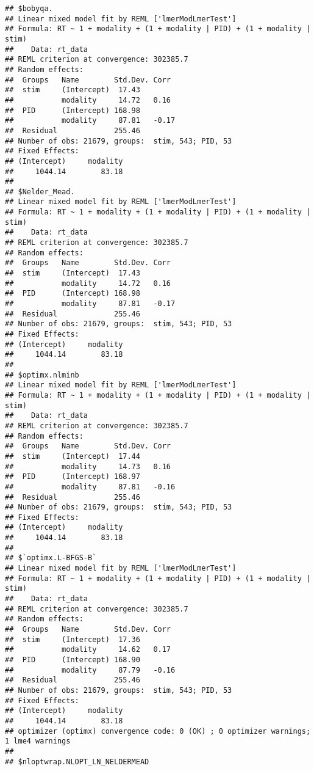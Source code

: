 \documentclass[
]{article}
\begin{document}
\begin{verbatim}
## $bobyqa.
## Linear mixed model fit by REML ['lmerModLmerTest']
## Formula: RT ~ 1 + modality + (1 + modality | PID) + (1 + modality | stim)
##    Data: rt_data
## REML criterion at convergence: 302385.7
## Random effects:
##  Groups   Name        Std.Dev. Corr 
##  stim     (Intercept)  17.43        
##           modality     14.72   0.16 
##  PID      (Intercept) 168.98        
##           modality     87.81   -0.17
##  Residual             255.46        
## Number of obs: 21679, groups:  stim, 543; PID, 53
## Fixed Effects:
## (Intercept)     modality  
##     1044.14        83.18  
## 
## $Nelder_Mead.
## Linear mixed model fit by REML ['lmerModLmerTest']
## Formula: RT ~ 1 + modality + (1 + modality | PID) + (1 + modality | stim)
##    Data: rt_data
## REML criterion at convergence: 302385.7
## Random effects:
##  Groups   Name        Std.Dev. Corr 
##  stim     (Intercept)  17.43        
##           modality     14.72   0.16 
##  PID      (Intercept) 168.98        
##           modality     87.81   -0.17
##  Residual             255.46        
## Number of obs: 21679, groups:  stim, 543; PID, 53
## Fixed Effects:
## (Intercept)     modality  
##     1044.14        83.18  
## 
## $optimx.nlminb
## Linear mixed model fit by REML ['lmerModLmerTest']
## Formula: RT ~ 1 + modality + (1 + modality | PID) + (1 + modality | stim)
##    Data: rt_data
## REML criterion at convergence: 302385.7
## Random effects:
##  Groups   Name        Std.Dev. Corr 
##  stim     (Intercept)  17.44        
##           modality     14.73   0.16 
##  PID      (Intercept) 168.97        
##           modality     87.81   -0.16
##  Residual             255.46        
## Number of obs: 21679, groups:  stim, 543; PID, 53
## Fixed Effects:
## (Intercept)     modality  
##     1044.14        83.18  
## 
## $`optimx.L-BFGS-B`
## Linear mixed model fit by REML ['lmerModLmerTest']
## Formula: RT ~ 1 + modality + (1 + modality | PID) + (1 + modality | stim)
##    Data: rt_data
## REML criterion at convergence: 302385.7
## Random effects:
##  Groups   Name        Std.Dev. Corr 
##  stim     (Intercept)  17.36        
##           modality     14.62   0.17 
##  PID      (Intercept) 168.90        
##           modality     87.79   -0.16
##  Residual             255.46        
## Number of obs: 21679, groups:  stim, 543; PID, 53
## Fixed Effects:
## (Intercept)     modality  
##     1044.14        83.18  
## optimizer (optimx) convergence code: 0 (OK) ; 0 optimizer warnings; 1 lme4 warnings 
## 
## $nloptwrap.NLOPT_LN_NELDERMEAD

\end{verbatim}
\end{document}
